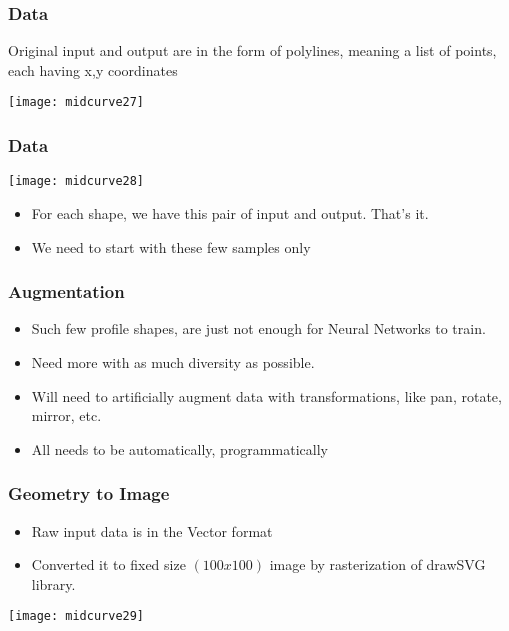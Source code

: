 \begin{frame}[fragile]\frametitle{Data}

Original input and output are in the form of polylines, meaning a list of points, each having x,y coordinates

\begin{center}
\texttt{[image: midcurve27]}
\end{center}	
\end{frame}

\begin{frame}[fragile]\frametitle{Data}
\begin{center}
\texttt{[image: midcurve28]}
\end{center}

	\begin{itemize}
	\item For each shape, we have this pair of input and output. That's it. 
	\item We need to start with these few samples only
	\end{itemize}
	
\end{frame}

\begin{frame}[fragile]\frametitle{Augmentation}

	\begin{itemize}
	\item Such few profile shapes, are  just not enough for Neural Networks to train.
	\item Need more with as much diversity as possible.
	\item Will need to artificially augment data with transformations, like pan, rotate, mirror, etc.
	\item All needs to be automatically, programmatically
	\end{itemize}
	
\end{frame}

\begin{frame}[fragile]\frametitle{Geometry to Image}
	\begin{itemize}
	\item Raw input data is in the Vector format
	\item Converted it to fixed size $(100x100)$ image by rasterization of drawSVG library.
	\end{itemize}
\begin{center}
\texttt{[image: midcurve29]}
\end{center}	
\end{frame}

